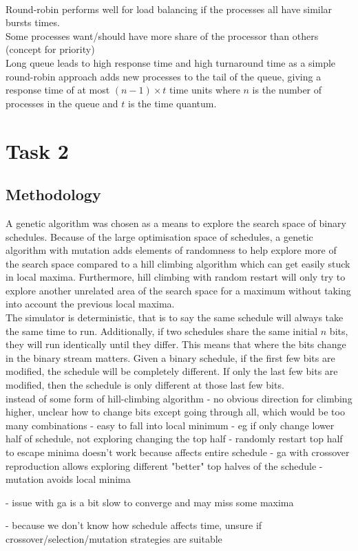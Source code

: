\documentclass{article}
\newcommand{\n}[0]{\\[\baselineskip]}
\begin{document}
\n
Round-robin performs well for load balancing if the processes all have similar bursts times. 
\n
Some processes want/should have more share of the processor than others (concept for priority)
\n
Long queue leads to high response time and high turnaround time as a simple round-robin approach adds new processes to the tail of the queue, giving a response time of at most $(n - 1) \times t$ time units where $n$ is the number of processes in the queue and $t$ is the time quantum.
\section{Task 2}

\subsection{Methodology}
A genetic algorithm was chosen as a means to explore the search space of binary schedules. Because of the large optimisation space of schedules, a genetic algorithm with mutation adds elements of randomness to help explore more of the search space compared to a hill climbing algorithm which can get easily stuck in local maxima. Furthermore, hill climbing with random restart will only try to explore another unrelated area of the search space for a maximum without taking into account the previous local maxima. 
\n
The simulator is deterministic, that is to say the same schedule will always take the same time to run. Additionally, if two schedules share the same initial $n$ bits, they will run identically until they differ. This means that where the bits change in the binary stream matters. Given a binary schedule, if the first few bits are modified, the schedule will be completely different. If only the last few bits are modified, then the schedule is only different at those last few bits.
\n
instead of some form of hill-climbing algorithm
- no obvious direction for climbing  higher, unclear how to change bits except going through all, which would be too many combinations
- easy to fall into local minimum 
- eg if only change lower half of schedule, not exploring changing the top half
- randomly restart top half to escape minima doesn't work because affects entire schedule
- ga with crossover reproduction allows exploring different "better" top halves of the schedule
- mutation avoids local minima

- issue with ga is a bit slow to converge and may miss some maxima

- because we don't know how schedule affects time, unsure if crossover/selection/mutation strategies are suitable
\end{document}
